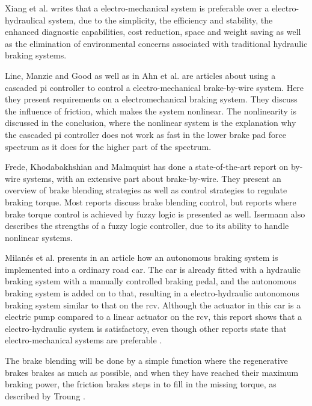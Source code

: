 \documentclass[a4paper,11pt]{kth-mag}
\begin{document}
Xiang et al. \cite{Xiang} writes that a electro-mechanical system is preferable over a electro-hydraulical system, due to the simplicity, the efficiency and stability, the enhanced diagnostic capabilities, cost reduction, space and weight saving as well as the elimination of environmental concerns associated with traditional hydraulic braking systems.\newline

Line, Manzie and Good \cite{2004-01-2050} as well as in Ahn et al. \cite{ahn2009analysis} are articles about using a cascaded \gls{pi} controller to control a electro-mechanical brake-by-wire system. Here they present requirements on a electromechanical braking system. They discuss the influence of friction, which makes the system nonlinear. The nonlinearity is discussed in the conclusion, where the nonlinear system is the explanation why the cascaded pi controller does not work as fast in the lower brake pad force spectrum as it does for the higher part of the spectrum. \newline



Frede, Khodabakhshian and Malmquist \cite{Frede460614} has done a state-of-the-art report on by-wire systems, with an extensive part about brake-by-wire. They present an overview of brake blending strategies as well as control strategies to regulate braking torque. Most reports discuss brake blending control, but reports where  brake torque control is achieved by fuzzy logic is presented as well. Isermann \cite{661149} also describes the strengths of a fuzzy logic controller, due to its ability to handle nonlinear systems. \newline

Milan{\'e}s et al. \cite{milanes2010electro} presents in an article how an autonomous braking system is implemented into a ordinary road car. The car is already fitted with a hydraulic braking system with a manually controlled braking pedal, and the autonomous braking system is added on to that, resulting in a electro-hydraulic autonomous braking system similar to that on the \gls{rcv}. 
Although the actuator in this car is a electric pump compared to a linear actuator on the \gls{rcv}, this report shows that a electro-hydraulic system is satisfactory, even though other reports state that electro-mechanical systems are preferable \cite{MechatronicsBook} \cite{Xiang}. \newline

The brake blending will be done by a simple function where the regenerative brakes brakes as much as possible, and when they have reached their maximum braking power, the friction brakes steps in to fill in the missing torque, as described by Troung \cite{truongdevelopment}. \newline
\end{document}
